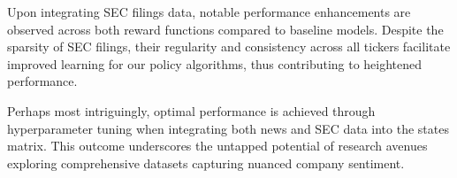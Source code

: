 Upon integrating SEC filings data, notable performance enhancements are observed across both reward functions compared to baseline models. Despite the sparsity of SEC filings, their regularity and consistency across all tickers facilitate improved learning for our policy algorithms, thus contributing to heightened performance.

Perhaps most intriguingly, optimal performance is achieved through hyperparameter tuning when integrating both news and SEC data into the states matrix. This outcome underscores the untapped potential of research avenues exploring comprehensive datasets capturing nuanced company sentiment.